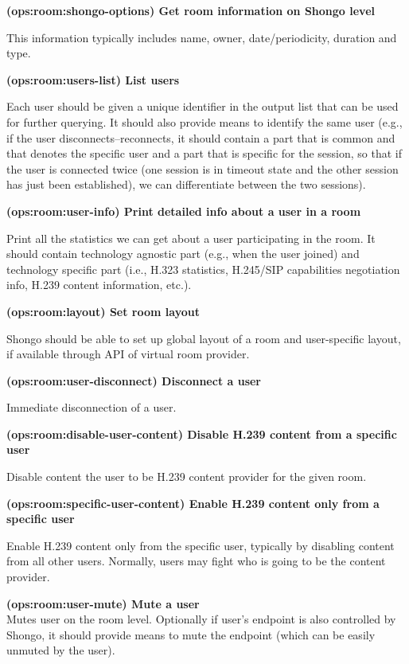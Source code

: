 \documentclass[a4paper]{report}
\makeatletter
\newcounter{UCcounter}
\newenvironment{UseCases}%
	{\begin{list}{\textbf{UC-\arabic{UCcounter}}}{\@nmbrlisttrue\def\@listctr{UCcounter}}}%
	{\end{list}}
\newcommand{\UClabel}[1]{\label{UC:#1}}
\newcommand{\UseCase}[2]{\item\UClabel{#2} \textbf{(#2) #1}\\ \nopagebreak}
\makeatother
\begin{document}
\begin{UseCases}

\UseCase{Get room information on Shongo level}{ops:room:shongo-options}

This information typically includes name, owner, date/periodicity, duration and type.


\UseCase{List users}{ops:room:users-list}

Each user should be given a unique identifier in the output list that can be
used for further querying. It should also provide means to identify the same
user (e.g., if the user disconnects--reconnects, it should contain a part that
is common and that denotes the specific user and a part that is specific for
the session, so that if the user is connected twice (one session is in timeout
state and the other session has just been established), we can differentiate
between the two sessions).

\UseCase{Print detailed info about a user in a room}{ops:room:user-info}

Print all the statistics we can get about a user participating in the room. It
should contain technology agnostic part (e.g., when the user joined) and
technology specific part (i.e., H.323 statistics, H.245/SIP capabilities
negotiation info, H.239 content information, etc.).

\UseCase{Set room layout}{ops:room:layout}

Shongo should be able to set up global layout of a room and user-specific
layout, if available through API of virtual room provider.

\UseCase{Disconnect a user}{ops:room:user-disconnect}

Immediate disconnection of a user.

\UseCase{Disable H.239 content from a specific user}{ops:room:disable-user-content}

Disable content the user to be H.239 content provider for the given room.

\UseCase{Enable H.239 content only from a specific user}{ops:room:specific-user-content}

Enable H.239 content only from the specific user, typically by disabling
content from all other users. Normally, users may fight who is going to be the
content provider.

\UseCase{Mute a user}{ops:room:user-mute} Mutes user on the room level.
Optionally if user's endpoint is also controlled by Shongo, it should provide
means to mute the endpoint (which can be easily unmuted by the user).


\end{UseCases}
\end{document}
